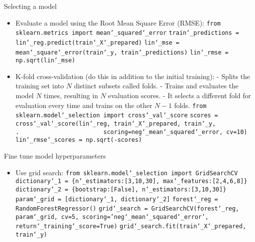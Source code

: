 Selecting a model
\vspace{-3.0mm}
\begin{itemize}
\item
Evaluate a model using the Root Mean Square Error (RMSE):\newline
\texttt{from sklearn.metrics import mean\char`_squared\char`_error}\newline
\texttt{train\char`_predictions = lin\char`_reg.predict(train\char`_X\char`_prepared)}\newline
\texttt{lin\char`_mse = mean\char`_square\char`_error(train\char`_y, train\char`_predictions)}\newline
\texttt{lin\char`_rmse = np.sqrt(lin\char`_mse)}
\item
K-fold cross-validation (do this in addition to the initial training):\newline
- Splits the training set into $N$ distinct subsets called folds.\newline
- Trains and evaluates the model $N$ times, resulting in $N$ evaluation scores.\newline
- It selects a different fold for evaluation every time and trains on the other $N-1$ folds.\newline
\texttt{from sklearn.model\char`_selection import cross\char`_val\char`_score}\newline
\texttt{scores = cross\char`_val\char`_score(lin\char`_reg, train\char`_X\char`_prepared, train\char`_y,}\newline
\texttt{.~~~~~~~~~~~~~~~~~~~~~~~~scoring=\textquotesingle neg\char`_mean\char`_squared\char`_error\textquotesingle, cv=10)}\newline
\texttt{lin\char`_rmse\char`_scores = np.sqrt(-scores)}\newline
\end{itemize}

Fine tune model hyperparameters
\begin{itemize}
\item
Use grid search:\newline
\texttt{from sklearn.model\char`_selection import GridSearchCV}\newline
\texttt{dictionary\char`_1 = \{\textquotesingle n\char`_estimators\textquotesingle:[3,10,30], \textquotesingle max\char`_features\textquotesingle:[2,4,6,8]\}}\newline
\texttt{dictionary\char`_2 = \{\textquotesingle bootstrap\textquotesingle:[False], \textquotesingle n\char`_estimators\textquotesingle:[3,10,30]\}}\newline
\texttt{param\char`_grid = [dictionary\char`_1, dictionary\char`_2]}\newline
\texttt{forest\char`_reg = RandomForestRegressor()}\newline
\texttt{grid\char`_search = GridSearchCV(forest\char`_reg, param\char`_grid, cv=5, scoring='neg\char`_mean\char`_squared\char`_error', return\char`_training\char`_score=True)}\newline
\texttt{grid\char`_search.fit(train\char`_X\char`_prepared, train\char`_y)}

\end{itemize}





